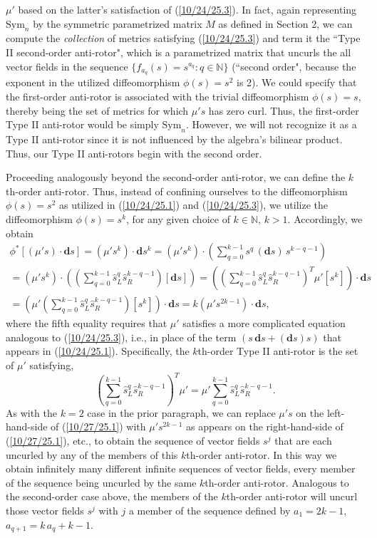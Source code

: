 \documentclass{amsart}
\theoremstyle{definition}
\numberwithin{theorem}{section}
\numberwithin{equation}{section}
\begin{document}
$\mu'$ based on the latter's satisfaction of (\ref{10/24/25.3}).  In fact, again representing $\text{Sym}_n$ by the symmetric parametrized matrix $M$ as defined in Section 2, we can compute the {\it collection} of metrics satisfying (\ref{10/24/25.3}) and term  it the ``Type II second-order anti-rotor", which is a parametrized matrix that uncurls the all vector fields in the sequence $\{f_{a_q}(s)=s^{a_q}:q\in\mathbb{N}\}$ (``second order", because the exponent in the utilized diffeomorphism $\phi(s)=s^2$ is 2).  We could specify that the first-order anti-rotor is associated with the trivial diffeomorphism $\phi(s)=s$, thereby being the set of metrics for which $\mu' s$ has zero curl.  Thus, the first-order Type II anti-rotor would be simply $\text{Sym}_n$.  However, we will not recognize it as a Type II anti-rotor since it is not influenced by the algebra's bilinear product.  Thus, our Type II anti-rotors begin with the second order.

Proceeding analogously beyond the second-order anti-rotor, we can define the $k$th-order anti-rotor.  Thus, instead of confining ourselves to the diffeomorphism $\phi(s)=s^2$ as utilized in (\ref{10/24/25.1}) and (\ref{10/24/25.3}), we utilize the diffeomorphism $\phi(s)=s^k$, for any given choice of $k\in\mathbb{N}$, $k>1$.   Accordingly, we obtain
\begin{multline}\label{10/27/25.1} \phi^*[(\mu' s)\cdot \mathbf{d}s] = (\mu' s^k)\cdot \mathbf{d}s^k =  (\mu' s^k)\cdot \left(\sum_{q=0}^{k-1} s^q\, (\mathbf{d}s)\, s^{k-q-1}\right) \\ = (\mu' s^k)\cdot \left(\left(\sum_{q=0}^{k-1} \hat{s}_L^q\hat{s}_R^{k-q-1}\right) [\mathbf{d}s]\right) =\left(\left(\sum_{q=0}^{k-1} \hat{s}_L^q\hat{s}_R^{k-q-1}\right)^T \mu' [s^k]\right)\cdot  \mathbf{d}s \\ = 
\left(\mu'\left(\sum_{q=0}^{k-1} \hat{s}_L^q\hat{s}_R^{k-q-1}\right)[s^k]\right)\cdot \mathbf{d}s = k(\mu' s^{2k-1})\cdot \mathbf{d}s,\end{multline} where the fifth equality requires that $\mu'$ satisfies a more complicated equation analogous to (\ref{10/24/25.3}), i.e.,  in place of the term $(s\,\mathbf{d}s + (\mathbf{d}s)s)$ that appears in (\ref{10/24/25.1}).  Specifically, the $k$th-order Type II anti-rotor is the set of $\mu'$ satisfying, \begin{equation}\label{10/29/25.5} \left(\sum_{q=0}^{k-1} \hat{s}_L^q\hat{s}_R^{k-q-1}\right)^T \mu' = 
\mu' \sum_{q=0}^{k-1} \hat{s}_L^q\hat{s}_R^{k-q-1}.\end{equation}
As with the $k=2$ case in the prior paragraph, we can replace $\mu' s$ on the left-hand-side of (\ref{10/27/25.1}) with 
$\mu' s^{2k-1}$ as appears on the right-hand-side of (\ref{10/27/25.1}), etc., to obtain the sequence of vector fields $s^j$ that are each uncurled by any of the members of this $k$th-order anti-rotor.  In this way we obtain infinitely many different infinite sequences of vector fields, every member of the sequence being uncurled by the same $k$th-order anti-rotor.  Analogous to the second-order case above, the members of the $k$th-order anti-rotor will uncurl those vector fields $s^j$ with $j$ a member of the sequence defined by $a_1=2k-1$, $a_{q+1} = k\, a_q + k-1$.   
  
\end{document}
